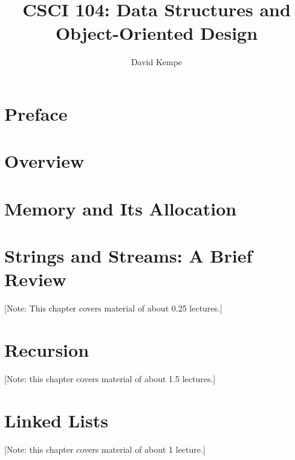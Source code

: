 \documentclass{book}
\title{CSCI 104: Data Structures and Object-Oriented Design}
\author{David Kempe}
\begin{document}
\begin{titlepage}
\maketitle
\end{titlepage}


\chapter*{Preface}
\label{chapter:preface}



\tableofcontents


\chapter{Overview}
\label{chapter:overview}

%


\chapter{Memory and Its Allocation}
\label{chapter:dynamic-memory}

%


\chapter{Strings and Streams: A Brief Review}
\label{chap:strings-streams}
[Note: This chapter covers material of about 0.25 lectures.]

%
% 

\chapter{Recursion}
\label{chap:recursion}
[Note: this chapter covers material of about 1.5 lectures.]

%
% 

\chapter{Linked Lists}
\label{chap:linked-lists}
[Note: this chapter covers material of about 1 lecture.]

%
% 
\end{document}
